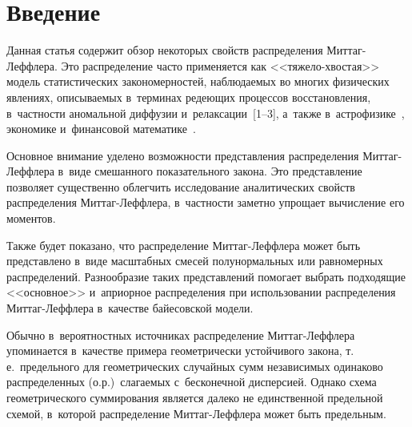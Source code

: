 
  
  \vspace*{6pt}



\thispagestyle{headings}

\begin{multicols}{2}

\label{st\stat}
  

\section{Введение}

Данная статья содержит обзор некоторых свойств распределения
Мит\-таг-Леф\-фле\-ра. Это рас\-пределение часто применяется как
<<тяжело-\linebreak хвостая>> модель статистических закономерностей, наблюдаемых
во многих физических явлениях, опи\-сы\-ва\-емых в~терминах редеющих
процессов восстановления, в~частности аномальной диффузии 
и~релаксации~[1--3], а~также в~астрофизике~\cite{Joseetal2010},
экономике и~финансовой математике~\cite{MeerschaertScalas2006,
Scalas2006}. 

Основное внимание уделено возможности представления
распределения Мит\-таг-Леф\-фле\-ра в~виде смешанного показательного
закона. Это пред\-став\-ле\-ние позволяет существенно облегчить
ис\-сле\-дование аналитических свойств распределения Мит\-таг-Леф\-фле\-ра, 
в~частности заметно упрощает вычисление его моментов. 

Также будет
показано, что распределение Мит\-таг-Леф\-фле\-ра может быть представлено
в~виде масштабных смесей полунормальных или равномерных
распределений. Разнообразие таких пред\-став\-ле\-ний помогает выбрать
подходящие <<основное>> и~априорное распределения при использовании
распределения Мит\-таг-Леф\-фле\-ра в~качестве байесовской модели.

Обычно в~вероятностных источниках распределение Мит\-таг-Леф\-фле\-ра
упоминается в~качестве примера геометрически устойчивого закона, т.\,е.\ 
предельного для геометрических случайных сумм независимых
одинаково распределенных (о.р.)\ слагаемых с~бесконечной дисперсией.
Однако схема геометрического суммирования является далеко не
единственной предельной схемой, в~которой распределение
Мит\-таг-Леф\-фле\-ра может быть предельным.


\end{multicols}
